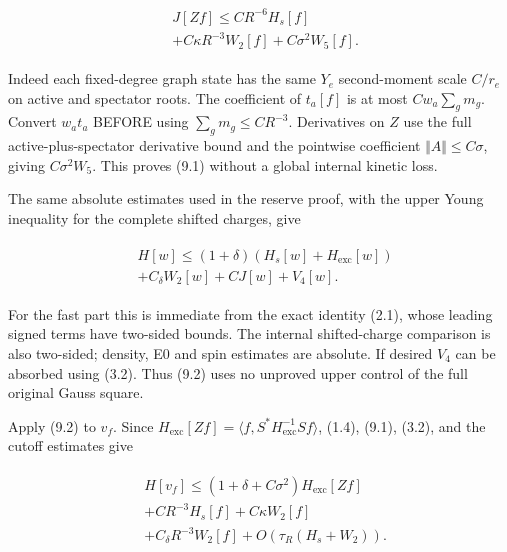 \begin{gather*}
\begin{aligned}
& J[Zf]\le C R^{-6}H_{s}[f] \\
& +C \kappa  R^{-3}W_{2}[f]+C \sigma ^{2} W_{5}[f].
\end{aligned}\tag{9.1}
\end{gather*}

Indeed each fixed-degree graph state has the same \(Y_{e}\)
second-moment scale \(C/r_{e}\) on active and spectator roots. The
coefficient of \(t_{a}[f]\) is at most \(C w_{a} \sum _{g} m_{g}\).
Convert \(w_{a} t_{a}\) BEFORE using \(\sum _{g} m_{g}\le CR^{-3}\).
Derivatives on \(Z\) use the full active-plus-spectator derivative bound
and the pointwise coefficient \(\Vert A\Vert \le C \sigma\), giving
\(C \sigma ^{2} W_{5}\). This proves (9.1) without a global internal
kinetic loss.

The same absolute estimates used in the reserve proof, with the upper
Young inequality for the complete shifted charges, give

\begin{gather*}
\begin{aligned}
& H[w]\le  (1+\delta )(H_{s}[w]+H_{\mathrm{exc}}[w]) \\
& +C_{\delta} W_{2}[w]+C J[w]+V_{4}[w].
\end{aligned}\tag{9.2}
\end{gather*}

For the fast part this is immediate from the exact identity (2.1), whose
leading signed terms have two-sided bounds. The internal shifted-charge
comparison is also two-sided; density, E0 and spin estimates are
absolute. If desired \(V_{4}\) can be absorbed using (3.2). Thus (9.2)
uses no unproved upper control of the full original Gauss square.

Apply (9.2) to \(v_{f}\). Since
\(H_{\mathrm{exc}}[Zf]=\langle f,S^{*}H_{\mathrm{exc}}^{-1}Sf\rangle\),
(1.4), (9.1), (3.2), and the cutoff estimates give

\begin{gather*}
\begin{aligned}
& H[v_{f}]\le  (1+\delta +C \sigma ^{2})H_{\mathrm{exc}}[Zf] \\
& +C R^{-3}H_{s}[f]+C \kappa  W_{2}[f] \\
& +C_{\delta} R^{-3}W_{2}[f]+O(\tau _{R}(H_{s}+W_{2})).
\end{aligned}\tag{9.3}
\end{gather*}

